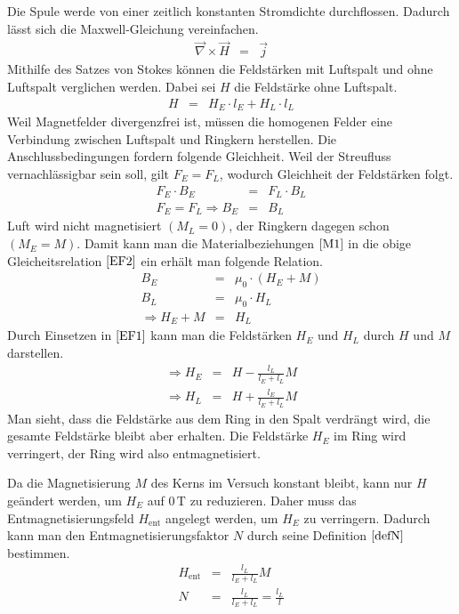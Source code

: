 \documentclass[12pt,a4paper]{scrartcl}
\numberwithin{equation}{section} %
\begin{document}
Die Spule werde von einer zeitlich konstanten Stromdichte durchflossen. Dadurch lässt sich die Maxwell-Gleichung vereinfachen.
\begin{eqnarray}
    \vec \nabla \times \vec H &=& \vec j
\end{eqnarray}
Mithilfe des Satzes von Stokes können die Feldstärken mit Luftspalt und ohne Luftspalt verglichen werden. Dabei sei $H$ die Feldstärke ohne Luftspalt.
\begin{eqnarray}
    H &=& H_E\cdot l_E + H_L \cdot l_L \label{EF1}
\end{eqnarray}
Weil Magnetfelder divergenzfrei ist, müssen die homogenen Felder eine Verbindung zwischen Luftspalt und Ringkern herstellen. Die Anschlussbedingungen fordern folgende Gleichheit. Weil der Streufluss vernachlässigbar sein soll, gilt $F_E = F_L$, wodurch Gleichheit der Feldstärken folgt.
\begin{eqnarray}
    F_E\cdot B_E &=& F_L\cdot B_L \nonumber \\
    F_E = F_L \Rightarrow B_E &=& B_L \label{EF2}
\end{eqnarray}
Luft wird nicht magnetisiert $(M_L=0)$, der Ringkern dagegen schon $(M_E=M)$. Damit kann man die Materialbeziehungen $\eqref{M1}$ in die obige Gleicheitsrelation $\eqref{EF2}$ ein erhält man folgende Relation.
\begin{eqnarray}
    B_E &=& \mu_0 \cdot \left(H_E + M\right) \nonumber \\
    B_L &=& \mu_0 \cdot H_L \nonumber \\
    \Rightarrow H_E + M &=& H_L \label{EF3}
\end{eqnarray}
Durch Einsetzen in $\eqref{EF1}$ kann man die Feldstärken $H_E$ und $H_L$ durch $H$ und $M$ darstellen.
\begin{eqnarray}
    \Rightarrow H_E &=& H - \frac{l_L}{l_E+l_L} M \\
    \Rightarrow H_L &=& H + \frac{l_E}{l_E+l_L} M
\end{eqnarray}
Man sieht, dass die Feldstärke aus dem Ring in den Spalt verdrängt wird, die gesamte Feldstärke bleibt aber erhalten. Die Feldstärke $H_E$ im Ring wird verringert, der Ring wird also entmagnetisiert.

Da die Magnetisierung $M$ des Kerns im Versuch konstant bleibt, kann nur $H$ geändert werden, um $H_E$ auf $0\mathrm{\,T}$ zu reduzieren. Daher muss das Entmagnetisierungsfeld $H_\mathrm{ent}$ angelegt
werden, um $H_E$ zu verringern. Dadurch kann man den Entmagnetisierungsfaktor $N$ durch seine Definition $\eqref{defN}$ bestimmen.
\begin{eqnarray}
    H_\mathrm{ent} &=& \frac{l_L}{l_E+l_L} M \\
    N &=& \frac{l_L}{l_E+l_L} = \frac{l_L}{l}
\end{eqnarray}
\end{document}
